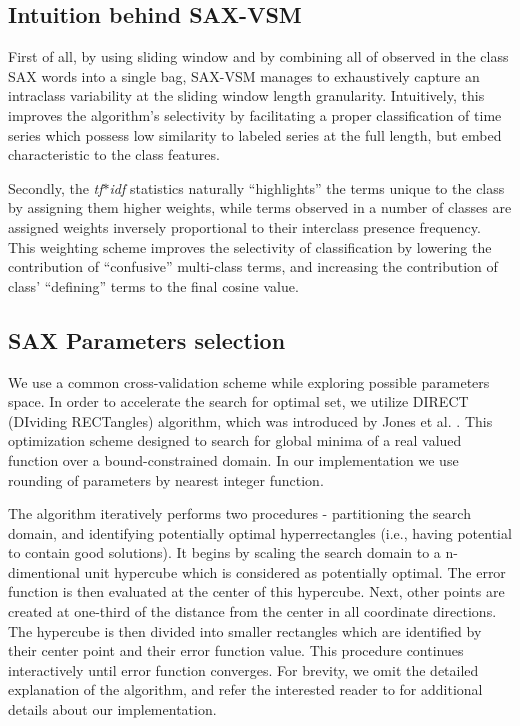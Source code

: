 \documentclass{llncs}
\begin{document}
\subsection{Intuition behind SAX-VSM}
First of all, by using sliding window and by combining all of observed in the class SAX words into a 
single bag, SAX-VSM manages to exhaustively capture an intraclass variability at the sliding window 
length granularity. Intuitively, this improves the algorithm's selectivity by facilitating a proper 
classification of time series which possess low similarity to labeled series at the full length, 
but embed characteristic to the class features.

Secondly, the \textit{tf$\ast$idf} statistics naturally ``highlights'' the terms unique to the class 
by assigning them higher weights, while terms observed in a number of classes are assigned weights 
inversely proportional to their interclass presence frequency. 
This weighting scheme improves the selectivity of classification by  lowering the contribution of 
``confusive'' multi-class terms, and  increasing  the contribution  of  class' ``defining''  terms 
to the final cosine value.

\subsection{SAX Parameters selection}
We use a common cross-validation scheme while exploring possible parameters space. 
In order to accelerate the search for optimal set, 
we utilize DIRECT (DIviding RECTangles) algorithm, which 
was introduced by Jones et al. \cite{direct-original}. This optimization scheme 
designed to search for global minima of a real valued function over a bound-constrained domain. 
In our implementation we use rounding of parameters by nearest integer function.

The algorithm iteratively performs two procedures - partitioning the search domain, 
and identifying potentially optimal hyperrectangles (i.e., having potential to contain good solutions). 
It begins by scaling the search domain to a n-dimentional unit hypercube which is considered 
as potentially optimal. The error function is then evaluated at the center of this hypercube. Next, 
other points are created at one-third of the distance from the center in all coordinate directions. 
The hypercube is then divided into smaller rectangles which are identified by their center point 
and their error function value. This procedure continues interactively until error function converges.
For brevity, we omit the detailed explanation of the algorithm, and refer the 
interested reader to \cite{direct} for additional details about our implementation.
\end{document}
